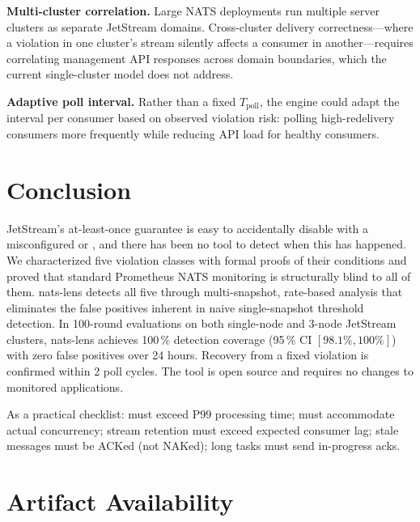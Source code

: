 \documentclass[sigconf,nonacm]{acmart}
\begin{document}
\textbf{Multi-cluster correlation.} Large NATS deployments run multiple
server clusters as separate JetStream domains. Cross-cluster delivery
correctness---where a violation in one cluster's stream silently affects
a consumer in another---requires correlating management API responses
across domain boundaries, which the current single-cluster model does
not address.

\textbf{Adaptive poll interval.} Rather than a fixed $T_\mathrm{poll}$,
the engine could adapt the interval per consumer based on observed
violation risk: polling high-redelivery consumers more frequently while
reducing API load for healthy consumers.

\section{Conclusion}

JetStream's at-least-once guarantee is easy to accidentally disable with a
misconfigured  or , and there
has been no tool to detect when this has happened. We characterized five
violation classes with formal proofs of their conditions and proved that
standard Prometheus NATS monitoring is structurally blind to all of them.
nats-lens detects all five through multi-snapshot, rate-based analysis that
eliminates the false positives inherent in naive single-snapshot threshold
detection. In 100-round evaluations on both single-node and 3-node
JetStream clusters, nats-lens achieves 100\,\% detection coverage
(95\,\% CI $[98.1\%, 100\%]$) with zero false positives over 24 hours.
Recovery from a fixed violation is confirmed within 2 poll cycles. The
tool is open source and requires no changes to monitored applications.

As a practical checklist:  must exceed P99 processing time;
 must accommodate actual concurrency; stream
retention must exceed expected consumer lag; stale messages must be ACKed
(not NAKed); long tasks must send in-progress acks.

\section*{Artifact Availability}
\end{document}
